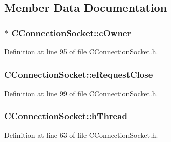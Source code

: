 \subsection{\-Member \-Data \-Documentation}
\hypertarget{class_c_connection_socket_a0eb429ece7da6cfb9337fcf760087145}{
\subsubsection[{c\-Owner}]{$\ast$ {\bf \-C\-Connection\-Socket\-::c\-Owner}}}\label{class_c_connection_socket_a0eb429ece7da6cfb9337fcf760087145}


\-Definition at line 95 of file \-C\-Connection\-Socket.\-h.

\hypertarget{class_c_connection_socket_a60bbd36d27ad2d0efd579243857773ac}{
\subsubsection[{e\-Request\-Close}]{ {\bf \-C\-Connection\-Socket\-::e\-Request\-Close}}}\label{class_c_connection_socket_a60bbd36d27ad2d0efd579243857773ac}


\-Definition at line 99 of file \-C\-Connection\-Socket.\-h.

\hypertarget{class_c_connection_socket_af47f017bb0e097654d633fd32da63024}{
\subsubsection[{h\-Thread}]{ {\bf \-C\-Connection\-Socket\-::h\-Thread}}}\label{class_c_connection_socket_af47f017bb0e097654d633fd32da63024}


\-Definition at line 63 of file \-C\-Connection\-Socket.\-h.

